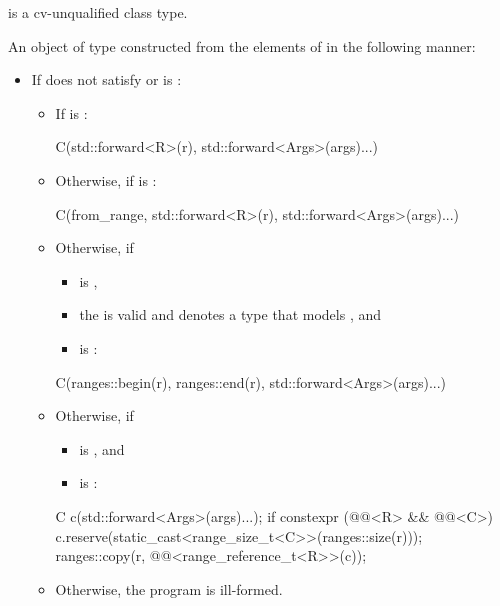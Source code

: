 \begin{itemdescr}
\pnum
\mandates
{} is a cv-unqualified class type.

\pnum
\returns
An object of type 
constructed from the elements of  in the following manner:
\begin{itemize}
\item
If  does not satisfy  or
is :
\begin{itemize}
\item
If  is :
\begin{codeblock}
C(std::forward<R>(r), std::forward<Args>(args)...)
\end{codeblock}
\item
Otherwise, if
is :
\begin{codeblock}
C(from_range, std::forward<R>(r), std::forward<Args>(args)...)
\end{codeblock}
\item
Otherwise, if
\begin{itemize}
\item
{} is ,
\item
the 
is valid and denotes a type that models
, and
\item
{}
is :
\end{itemize}
\begin{codeblock}
C(ranges::begin(r), ranges::end(r), std::forward<Args>(args)...)
\end{codeblock}
\item
Otherwise, if
\begin{itemize}
\item
{} is , and
\item
{} is :
\end{itemize}
\begin{codeblock}
C c(std::forward<Args>(args)...);
if constexpr (@@<R> && @@<C>)
  c.reserve(static_cast<range_size_t<C>>(ranges::size(r)));
ranges::copy(r, @@<range_reference_t<R>>(c));
\end{codeblock}
\item
Otherwise, the program is ill-formed.
\end{itemize}


\end{itemize}
\end{itemdescr}
